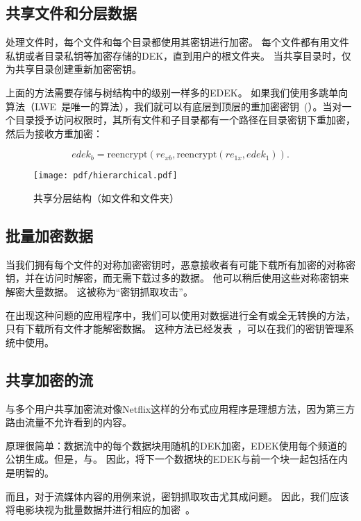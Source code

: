 \documentclass[longbibliography,nofootinbib]{revtex4-1}
\newcommand{\kms}{NuCypher KMS}
\begin{document}
\begin{CJK*}{UTF8}{gbsn}
\subsection{共享文件和分层数据}
\label{sec:hierarchical-data}

	处理文件时，每个文件和每个目录都使用其密钥进行加密。 每个文件都有用文件私钥或者目录私钥等加密存储的DEK，直到用户的根文件夹。 当共享目录时，仅为共享目录创建重新加密密钥。
    
    上面的方法需要存储与树结构中的级别一样多的EDEK。 如果我们使用多跳单向算法（LWE~\cite{lwe-reencryption}是唯一的算法），我们就可以有底层到顶层的重加密密钥~(）。当对一个目录授予访问权限时，其所有文件和子目录都有一个路径在目录密钥下重加密，然后为接收方重加密：

\begin{equation}
    edek_b = \text{reencrypt}(re_{xb}, \text{reencrypt}(re_{1x}, edek_1)).
\end{equation}
\begin{figure}
\centering
    \texttt{[image: pdf/hierarchical.pdf]}
    \caption{共享分层结构（如文件和文件夹）}
    \label{fig:hierarchical-pre}
\end{figure}

\subsection{批量加密数据}

	当我们拥有每个文件的对称加密密钥时，恶意接收者有可能下载所有加密的对称密钥，并在访问时解密，而无需下载过多的数据。 他可以稍后使用这些对称密钥来解密大量数据。 这被称为“密钥抓取攻击”。
    
    在出现这种问题的应用程序中，我们可以使用对数据进行全有或全无转换的方法，只有下载所有文件才能解密数据。 这种方法已经发表~\cite{aont-bulk}，可以在我们的密钥管理系统中使用。

\subsection{共享加密的流}

与多个用户共享加密流对像Netflix这样的分布式应用程序是理想方法，因为第三方路由流量不允许看到的内容。

    原理很简单：数据流中的每个数据块用随机的DEK加密，EDEK使用每个频道的公钥生成。但是，与。 因此，将下一个数据块的EDEK与前一个块一起包括在内是明智的。
    
    而且，对于流媒体内容的用例来说，密钥抓取攻击尤其成问题。 因此，我们应该将电影块视为批量数据并进行相应的加密~\cite{aont-bulk}。
    

\end{CJK*}
\end{document}
